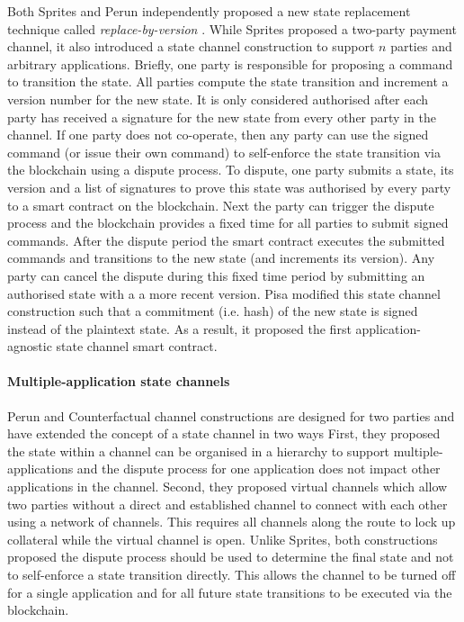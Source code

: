 \documentclass{llncs}
\begin{document}
	Both Sprites  and Perun independently proposed a new state replacement technique called \textit{replace-by-version} \cite{miller2017sprites,dziembowski2017perun}. 
	While Sprites proposed a two-party payment channel, it also introduced a state channel construction to support $n$ parties and arbitrary applications. 
	Briefly, one party is responsible for proposing a command to transition the state.
	All parties compute the state transition and increment a version number for the new state. 
	It is only considered authorised after each party has received a signature for the new state from every other party in the channel. 
	If one party does not co-operate, then any party can use the signed command (or issue their own command) to self-enforce the state transition via the blockchain using a dispute process. 
	To dispute, one party submits a state, its version and a list of signatures to prove this state was authorised by every party to a smart contract on the blockchain. 
	Next the party can trigger the dispute process and the blockchain provides a fixed time for all parties to submit signed commands. 
	After the dispute period the smart contract executes the submitted commands and transitions to the new state (and increments its version).  
	Any party can cancel the dispute during this fixed time period by submitting an authorised state with a a more recent version. 
	Pisa modified this state channel construction such that a commitment (i.e. hash) of the new state is signed instead of the plaintext state. 
	As a result, it proposed the first application-agnostic state channel smart contract. 
	
	\paragraph{Multiple-application state channels} \label{sec:multiapp}
	Perun and Counterfactual channel constructions are designed for two parties and have extended the concept of a state channel in two ways \cite{dziembowski2017perun,coleman2018counterfactual} 
	First, they proposed the state within a channel can be organised in a hierarchy to support multiple-applications and the dispute process for one application does not impact other applications in the channel. 
	Second, they proposed virtual channels which allow two parties without a direct and established channel to connect with each other using a network of channels. 
	This requires all channels along the route to lock up collateral while the virtual channel is open. 
	Unlike Sprites, both constructions proposed the dispute process should be used to determine the final state and not to self-enforce a state transition directly. 
	This allows the channel to be turned off for a single application and for all future state transitions to be executed via the blockchain. 
	
\end{document}
